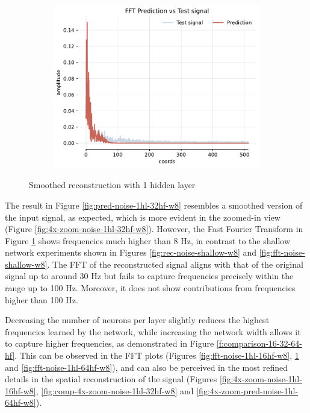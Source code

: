 \begin{figure}[h]
    \begin{subfigure}[b]{0.32\textwidth}
        \centering
        \includegraphics[width=\textwidth]{img/ch4/fft-noise-1hl-32hf-w8.pdf}
        \caption{}
        \label{fig:fft-noise-1hl-32hf-w8}
    \end{subfigure}
    \caption{Smoothed reconstruction with 1 hidden layer}
    \label{f:rec-1hl-32hf-8hz}
\end{figure}

The result in Figure \ref{fig:pred-noise-1hl-32hf-w8} resembles a smoothed version of the input signal, as expected, which is more evident in the zoomed-in view (Figure \ref{fig:4x-zoom-noise-1hl-32hf-w8}). However, the Fast Fourier Transform in Figure \ref{fig:fft-noise-1hl-32hf-w8} shows frequencies much higher than 8 Hz, in contrast to the shallow network experiments shown in Figures \ref{fig:rec-noise-shallow-w8} and \ref{fig:fft-noise-shallow-w8}. The FFT of the reconstructed signal aligns with that of the original signal up to around 30 Hz but fails to capture frequencies precisely within the range up to 100 Hz. Moreover, it does not show contributions from frequencies higher than 100 Hz.

Decreasing the number of neurons per layer slightly reduces the highest frequencies learned by the network, while increasing the network width allows it to capture higher frequencies, as demonstrated in Figure \ref{f:comparison-16-32-64-hf}. This can be observed in the FFT plots (Figures \ref{fig:fft-noise-1hl-16hf-w8}, \ref{fig:fft-noise-1hl-32hf-w8} and \ref{fig:fft-noise-1hl-64hf-w8}), and can also be perceived in the most refined details in the spatial reconstruction of the signal (Figures \ref{fig:4x-zoom-noise-1hl-16hf-w8}, \ref{fig:comp-4x-zoom-noise-1hl-32hf-w8} and \ref{fig:4x-zoom-pred-noise-1hl-64hf-w8}).

